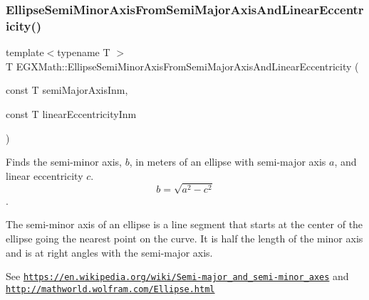 \mbox{\label{group___e_g_x_math-_geometry-2_d-_ellipse-_semi_minor_axis_ga001beab4a083da9dd00dace28e749284}} 
\subsubsection{\texorpdfstring{Ellipse\+Semi\+Minor\+Axis\+From\+Semi\+Major\+Axis\+And\+Linear\+Eccentricity()}{EllipseSemiMinorAxisFromSemiMajorAxisAndLinearEccentricity()}}
{\footnotesize\ttfamily template$<$typename T $>$ \\
T E\+G\+X\+Math\+::\+Ellipse\+Semi\+Minor\+Axis\+From\+Semi\+Major\+Axis\+And\+Linear\+Eccentricity (\begin{DoxyParamCaption}\item[{const T}]{semi\+Major\+Axis\+Inm,  }\item[{const T}]{linear\+Eccentricity\+Inm }\end{DoxyParamCaption})}



Finds the semi-\/minor axis, $b$, in meters of an ellipse with semi-\/major axis $a$, and linear eccentricity $c$. \[ b=\sqrt{a^2-c^2} \]. 

The semi-\/minor axis of an ellipse is a line segment that starts at the center of the ellipse going the nearest point on the curve. It is half the length of the minor axis and is at right angles with the semi-\/major axis.

See \href{https://en.wikipedia.org/wiki/Semi-major_and_semi-minor_axes}{\tt https\+://en.\+wikipedia.\+org/wiki/\+Semi-\/major\+\_\+and\+\_\+semi-\/minor\+\_\+axes} and \href{http://mathworld.wolfram.com/Ellipse.html}{\tt http\+://mathworld.\+wolfram.\+com/\+Ellipse.\+html}


